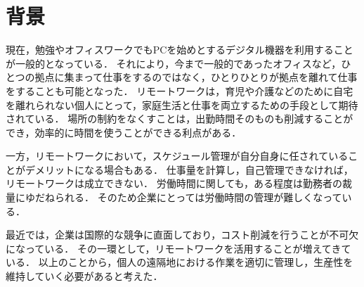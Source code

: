 \section{背景}
現在，勉強やオフィスワークでもPCを始めとするデジタル機器を利用することが一般的となっている．
それにより，今まで一般的であったオフィスなど，ひとつの拠点に集まって仕事をするのではなく，ひとりひとりが拠点を離れて仕事をすることも可能となった．
リモートワークは，育児や介護などのために自宅を離れられない個人にとって，家庭生活と仕事を両立するための手段として期待されている．
場所の制約をなくすことは，出勤時間そのものも削減することができ，効率的に時間を使うことができる利点がある\cite{tele2017}．

一方，リモートワークにおいて，スケジュール管理が自分自身に任されていることがデメリットになる場合もある．
仕事量を計算し，自己管理できなければ，リモートワークは成立できない．
労働時間に関しても，ある程度は勤務者の裁量にゆだねられる．
そのため企業にとっては労働時間の管理が難しくなっている\cite{Adachi2010}．

最近では，企業は国際的な競争に直面しており，コスト削減を行うことが不可欠になっている．
その一環として，リモートワークを活用することが増えてきている\cite{Telework2010}．
以上のことから，個人の遠隔地における作業を適切に管理し，生産性を維持していく必要があると考えた．
